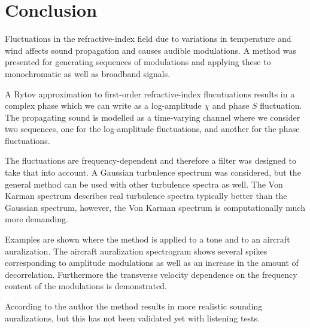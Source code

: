 \section{Conclusion}
Fluctuations in the refractive-index field due to variations in temperature and
wind affects sound propagation and causes audible modulations. A method was
presented for generating sequences of modulations and applying these to
monochromatic as well as broadband signals.

A Rytov approximation to first-order refractive-index flucutuations results in a complex
phase which we can write as a log-amplitude $\chi$ and phase $S$ fluctuation.
The propagating sound is modelled as a time-varying channel where we consider
two sequences, one for the log-amplitude fluctuations, and another for the phase
fluctuations.

The fluctuations are frequency-dependent and therefore a filter was designed to take that into account.
A Gaussian turbulence spectrum was considered, but the general method can be
used with other turbulence spectra as well. The Von Karman spectrum describes
real turbulence spectra typically better than the Gaussian spectrum, however,
the Von Karman spectrum is computationally much more demanding.

Examples are shown where the method is applied to a tone and to an aircraft
auralization. The aircraft auralization spectrogram shows several spikes
corresponding to amplitude modulations as well as an increase in the amount of
decorrelation. Furthermore the transverse velocity dependence on the frequency
content of the modulations is demonstrated.

According to the author the method results in more realistic sounding
auralizations, but this has not been validated yet with listening tests.

